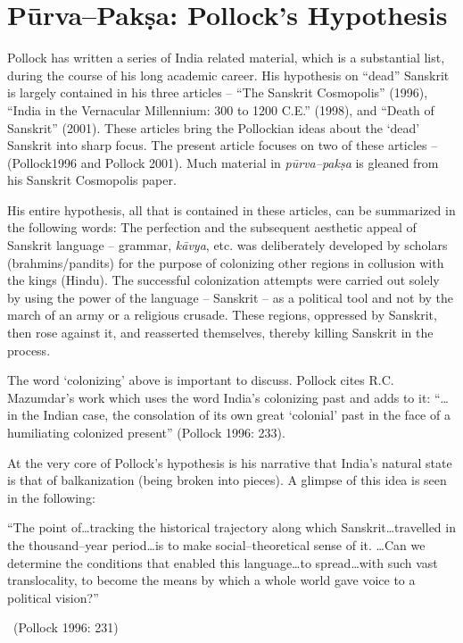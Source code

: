 \section*{Pūrva–Pakṣa: Pollock’s Hypothesis}

Pollock has written a series of India related material, which is a substantial list, during the course of his long academic career. His hypothesis on “dead” Sanskrit is largely contained in his three articles – “The Sanskrit Cosmopolis” (1996), “India in the Vernacular Millennium: 300 to 1200 C.E.” (1998), and “Death of Sanskrit” (2001). These articles bring the Pollockian ideas about the ‘dead’ Sanskrit into sharp focus. The present article focuses on two of these articles – (Pollock1996 and Pollock 2001). Much material in \textit{pūrva–pakṣa} is gleaned from his Sanskrit Cosmopolis paper.

His entire hypothesis, all that is contained in these articles, can be summarized in the following words: The perfection and the subsequent aesthetic appeal of Sanskrit language – grammar, \textit{kāvya}, etc. was deliberately developed by scholars (brahmins/pandits) for the purpose of colonizing other regions in collusion with the kings (Hindu). The successful colonization attempts were carried out solely by using the power of the language – Sanskrit – as a political tool and not by the march of an army or a religious crusade. These regions, oppressed by Sanskrit, then rose against it, and reasserted themselves, thereby killing Sanskrit in the process.

The word ‘colonizing’ above is important to discuss. Pollock cites R.C. Mazumdar’s work which uses the word India’s colonizing past and adds to it: “…in the Indian case, the consolation of its own great ‘colonial’ past in the face of a humiliating colonized present” (Pollock 1996: 233).

At the very core of Pollock’s hypothesis is his narrative that India’s natural state is that of balkanization (being broken into pieces). A glimpse of this idea is seen in the following:

\begin{myquote}
“The point of…tracking the historical trajectory along which Sanskrit…travelled in the thousand–year period…is to make social–theoretical sense of it. …Can we determine the conditions that enabled this language…to spread…with such vast translocality, to become the means by which a whole world gave voice to a political vision?” 

~\hfill (Pollock 1996: 231)
\end{myquote}

